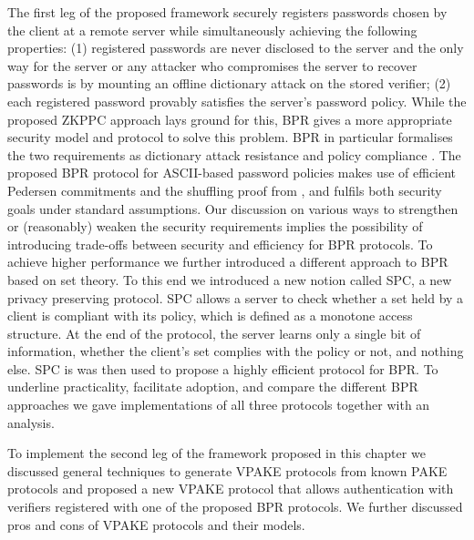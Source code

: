 The first leg of the proposed framework securely registers passwords chosen by the client at a remote server while simultaneously achieving the following properties: (1) registered passwords are never disclosed to the server and the only way for the server or any attacker who compromises the server to recover passwords is by mounting an offline dictionary attack on the stored verifier; (2) each registered password provably satisfies the server's password policy. 
While the proposed \ac{ZKPPC} approach lays ground for this, \ac{BPR} gives a more appropriate security model and protocol to solve this problem.
\ac{BPR} in particular formalises the two requirements as dictionary attack resistance and policy compliance .
The proposed \ac{BPR} protocol for \ac{ASCII}-based password policies makes use of efficient Pedersen commitments and the shuffling proof from \cite{Furukawa05}, and fulfils both security goals under standard assumptions.
Our discussion on various ways to strengthen or (reasonably) weaken the security requirements implies the possibility of introducing trade-offs between security and efficiency for \ac{BPR} protocols.
To achieve higher performance we further introduced a different approach to \ac{BPR} based on set theory.
To this end we introduced a new notion called \acl{SPC}, a new privacy preserving protocol. 
\ac{SPC} allows a server to check whether a set held by a client is compliant with its policy, which is defined as a monotone access structure. 
At the end of the protocol, the server learns only a single bit of information, \ie whether the client's set complies with the policy or not, and nothing else. 
\ac{SPC} is was then used to propose a highly efficient protocol for \ac{BPR}.
To underline practicality, facilitate adoption, and compare the different \ac{BPR} approaches we gave implementations of all three protocols together with an analysis.

To implement the second leg of the framework proposed in this chapter we discussed general techniques to generate \ac{VPAKE} protocols from known \ac{PAKE} protocols and proposed a new \ac{VPAKE} protocol that allows authentication with verifiers registered with one of the proposed \ac{BPR} protocols.
We further discussed pros and cons of \ac{VPAKE} protocols and their models.
